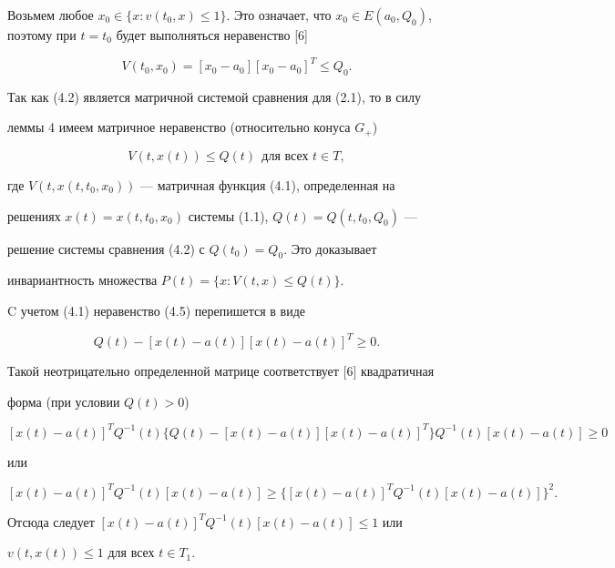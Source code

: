 \begin{pf}


Возьмем любое $x_0\in\{x:v(t_0,x)\le1\}$. Это означает, что $x_0\in


E(a_0,Q_0)$, поэтому при $t=t_0$ будет выполняться неравенство [6]


$$


V(t_0,x_0)=[x_0-a_0][x_0-a_0]^T\le Q_0.


$$


Так как (4.2) является матричной системой сравнения для (2.1), то в силу


леммы 4 имеем матричное неравенство (относительно конуса $G_+$)


\begin{equation}


V(t,x(t))\le Q(t)\ \ \text{для всех $t\in T$},


\end{equation}


где $V(t,x(t,t_0,x_0))$ --- матричная функция (4.1), определенная на


решениях $x(t)=x(t,t_0,x_0)$ системы (1.1), $Q(t)=Q(t,t_0,Q_0)$ ---


решение системы сравнения (4.2) с $Q(t_0)=Q_0$. Это доказывает


инвариантность множества $P(t)=\{x:V(t,x)\le Q(t)\}$.





C учетом (4.1) неравенство (4.5) перепишется в виде


$$


Q(t)-[x(t)-a(t)][x(t)-a(t)]^T\ge0.


$$


Такой неотрицательно определенной матрице соответствует [6] квадратичная


форма (при условии $Q(t)>0$)


$$


[x(t)-a(t)]^T Q^{-1}(t)\{Q(t)-[x(t)-a(t)][x(t)-a(t)]^T\}Q^{-1}(t)


[x(t)-a(t)]\ge0


$$


или


$$


[x(t)-a(t)]^T Q^{-1}(t)[x(t)-a(t)]\ge\{[x(t)-a(t)]^T Q^{-1}(t)


[x(t)-a(t)]\}^2.


$$


Отсюда следует $[x(t)-a(t)]^T Q^{-1}(t)[x(t)-a(t)]\le1$ или


$v(t,x(t))\le1$ для всех $t\in T_1$.


\end{pf}






